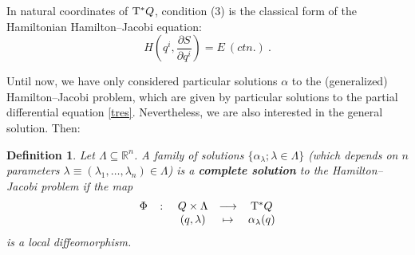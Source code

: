 \documentclass[12pt]{report}
\newtheorem{definition}[teor]{Definition}
\def\beq{\begin{equation}}
\def\eeq{\end{equation}}
\def\derpar#1#2{\frac{\partial{#1}}{\partial{#2}}}
\def\Real{\mathbb{R}}
\def\Tan{{\rm T}}
\begin{document}
In natural coordinates of $\Tan^*Q$, condition (3) is the classical form of the
Hamiltonian Hamilton--Jacobi equation:
\beq
H\left(q^i,\derpar{S}{q^i}\right)= E\ (ctn.) \ .
\label{tres}
\eeq

Until now, we have only considered particular solutions $\alpha$
to the (generalized) Hamilton--Jacobi problem, which are given by particular solutions
to the partial differential equation \eqref{tres}.
Nevertheless, we are also interested in the general solution. Then:

\begin{definition}
\label{completeHJ}
Let $\Lambda\subseteq\Real^n$.
A family of  solutions $\{ \alpha_\lambda; \lambda\in\Lambda\}$
(which depends on $n$ parameters
$\lambda\equiv (\lambda_1,\ldots,\lambda_n)\in\Lambda$)
is a \textbf{complete solution} to the Hamilton--Jacobi problem 
if the map 
$$
\begin{array}{ccccc}
\Phi & \colon &Q\times\Lambda & \longrightarrow & \Tan^*Q \\
 & & (q,\lambda) & \mapsto & \alpha_\lambda(q)
\end{array}
$$
is a local diffeomorphism.
\end{definition}
\end{document}

